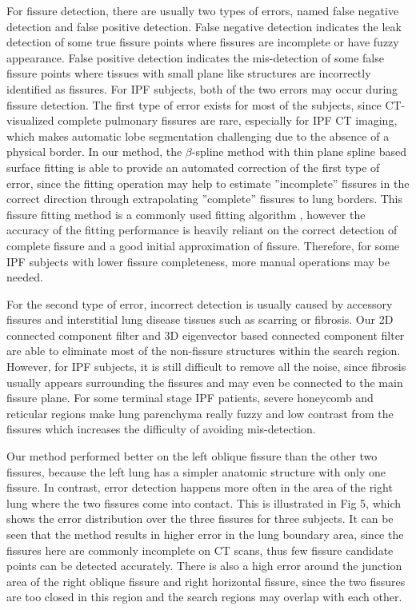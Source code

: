 {For fissure detection, there are usually two types of errors, named false negative detection and false positive detection. False negative detection indicates the leak detection of some true fissure points where fissures are incomplete or have fuzzy appearance. False positive detection indicates the mis-detection of some false fissure points where tissues with small plane like structures are incorrectly identified as fissures. For IPF subjects, both of the two errors may occur during fissure detection. The first type of error exists for most of the subjects, since CT-visualized complete pulmonary fissures are rare, especially for IPF CT imaging, which makes automatic lobe segmentation challenging due to the absence of a physical border. In our method, the $\beta$-spline method with thin plane spline based surface fitting is able to provide an automated correction of the first type of error, since the fitting operation may help to estimate ''incomplete'' fissures in the correct direction through extrapolating ''complete'' fissures to lung borders. This fissure fitting method  is a commonly used fitting algorithm \citep{lee1997scattered,doel2012pulmonary}, however the accuracy of the fitting performance is heavily reliant on the correct detection of complete fissure and a good initial approximation of fissure. Therefore, for some IPF subjects with lower fissure completeness, more manual operations may be needed.

For the second type of error, incorrect detection is usually caused by accessory fissures and interstitial lung disease tissues such as scarring or fibrosis. Our 2D connected component filter and 3D eigenvector based connected component filter are able to eliminate most of the non-fissure structures within the search region. However, for IPF subjects, it is still difficult to remove all the noise, since fibrosis usually appears surrounding the fissures and may even be connected to the main fissure plane. For some terminal stage IPF patients, severe honeycomb and reticular regions make lung parenchyma really fuzzy and low contrast from the fissures which increases the difficulty of avoiding mis-detection.

Our method performed better on the left oblique fissure than the other two fissures, because the left lung has a simpler anatomic structure with only one fissure. In contrast, error detection happens more often in the area of the right lung where the two fissures come into contact. This is illustrated in Fig 5, which shows the error distribution over the three fissures for three subjects. It can be seen that the method results in higher error in the lung boundary area, since the fissures here are commonly incomplete on CT scans, thus few fissure candidate points can be detected accurately. There is also a high error around the junction area of the right oblique fissure and right horizontal fissure, since the two fissures are too closed in this region and the search regions may overlap with each other.

}

